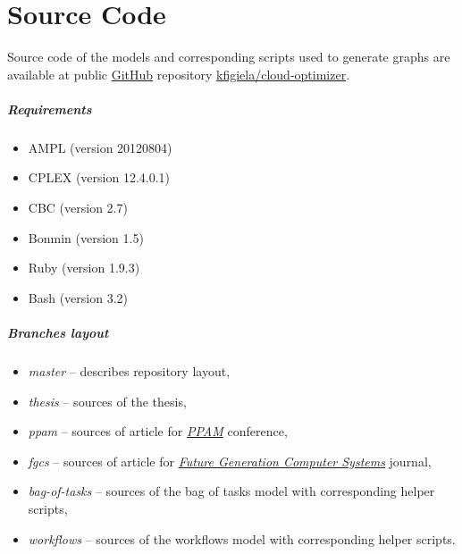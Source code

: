 \chapter{Source Code} %

\label{AppendixA}

Source code of the models and corresponding scripts used to generate graphs are available at public \href{https://github.com}{GitHub} repository \href{https://github.com/kfigiela/cloud-optimizer}{kfigiela/cloud-optimizer}. 

\paragraph{Requirements}

\begin{itemize}
  \item AMPL (version 20120804)
  \item CPLEX (version 12.4.0.1)
  \item CBC (version 2.7)
  \item Bonmin (version 1.5)
  \item Ruby (version 1.9.3)
  \item Bash (version 3.2)
\end{itemize}

\paragraph{Branches layout}

\begin{itemize}
  \item \emph{master} -- describes repository layout,
  \item \emph{thesis} -- sources of the thesis, 
  \item \emph{ppam} -- sources of article for \emph{\href{http://ppam.pl}{PPAM}} conference,
  \item \emph{fgcs} -- sources of article for \emph{\href{http://www.journals.elsevier.com/future-generation-computer-systems/}{Future Generation Computer Systems}}  journal,
  \item \emph{bag-of-tasks} -- sources of the bag of tasks model with corresponding helper scripts,
  \item \emph{workflows} -- sources of the workflows model with corresponding helper scripts.
\end{itemize}
